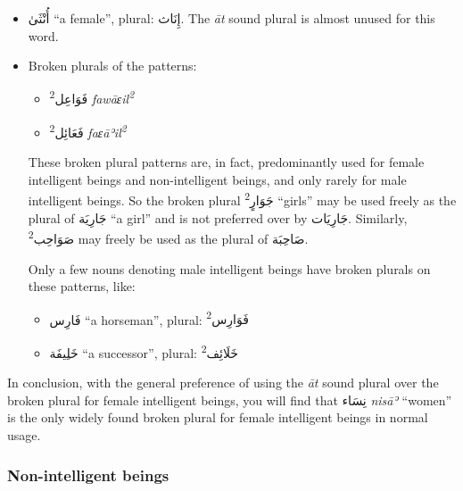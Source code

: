 \documentclass[
  10pt,
]{book}
\providecommand{\tightlist}{%
  \setlength{\itemsep}{0pt}\setlength{\parskip}{0pt}}
\begin{document}
\begin{itemize}
\item
  \foreignlanguage{arabic}{أُنْثَىٰ} \enquote{a female}, plural: \foreignlanguage{arabic}{إِنَاث}. The \emph{āt} sound plural is almost unused for this word.
\item
  Broken plurals of the patterns:

  \begin{itemize}
  \tightlist
  \item
    \foreignlanguage{arabic}{فَوَاعِل\textsuperscript{2}} \emph{fawāɛil\textsuperscript{2}}
  \item
    \foreignlanguage{arabic}{فَعَائِل\textsuperscript{2}} \emph{faɛāʾil\textsuperscript{2}}
  \end{itemize}

  These broken plural patterns are, in fact, predominantly used for female intelligent beings and non-intelligent beings, and only rarely for male intelligent beings. So the broken plural \foreignlanguage{arabic}{جَوَارٍ\textsuperscript{2}} \enquote{girls} may be used freely as the plural of \foreignlanguage{arabic}{جَارِيَة} \enquote{a girl} and is not preferred over by \foreignlanguage{arabic}{جَارِيَات}. Similarly, \foreignlanguage{arabic}{صَوَاحِب\textsuperscript{2}} may freely be used as the plural of \foreignlanguage{arabic}{صَاحِبَة}.

  Only a few nouns denoting male intelligent beings have broken plurals on these patterns, like:

  \begin{itemize}
  \tightlist
  \item
    \foreignlanguage{arabic}{فَارِس} \enquote{a horseman}, plural: \foreignlanguage{arabic}{فَوَارِس\textsuperscript{2}}
  \item
    \foreignlanguage{arabic}{خَلِيفَة} \enquote{a successor}, plural: \foreignlanguage{arabic}{خَلَائِف\textsuperscript{2}}
  \end{itemize}
\end{itemize}

In conclusion, with the general preference of using the \emph{āt} sound plural over the broken plural for female intelligent beings, you will find that \foreignlanguage{arabic}{نِسَاء} \emph{nisāʾ} \enquote{women} is the only widely found broken plural for female intelligent beings in normal usage.

\subsubsection{Non-intelligent beings}\label{non-intelligent-beings}
\end{document}
